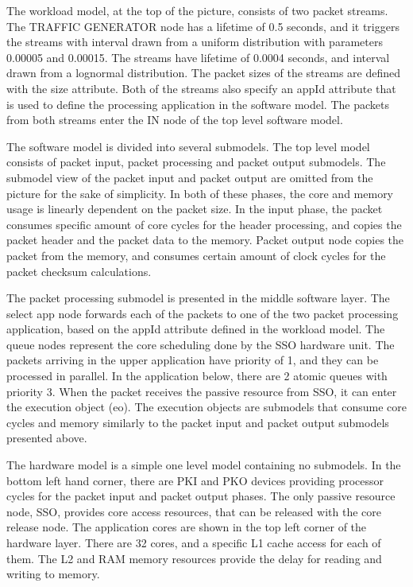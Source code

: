The workload model, at the top of the picture, consists of two packet streams. The TRAFFIC GENERATOR node has a lifetime of 0.5 seconds, and it triggers the streams with interval drawn from a uniform distribution with parameters 0.00005 and 0.00015. The streams have lifetime of 0.0004 seconds, and interval drawn from a lognormal distribution. The packet sizes of the streams are defined with the size attribute. Both of the streams also specify an appId attribute that is used to define the processing application in the software model. The packets from both streams enter the IN node of the top level software model.

The software model is divided into several submodels. The top level model consists of packet input, packet processing and packet output submodels. The submodel view of the packet input and packet output are omitted from the picture for the sake of simplicity. In both of these phases, the core and memory usage is linearly dependent on the packet size. In the input phase, the packet consumes specific amount of core cycles for the header processing, and copies the packet header and the packet data to the memory. Packet output node copies the packet from the memory, and consumes certain amount of clock cycles for the packet checksum calculations.

The packet processing submodel is presented in the middle software layer. The select app node forwards each of the packets to one of the two packet processing application, based on the appId attribute defined in the workload model. The queue nodes represent the core scheduling done by the SSO hardware unit. The packets arriving in the upper application have priority of 1, and they can be processed in parallel. In the application below, there are 2 atomic queues with priority 3. When the packet receives the passive resource from SSO, it can enter the execution object (eo). The execution objects are submodels that consume core cycles and memory similarly to the packet input and packet output submodels presented above.

The hardware model is a simple one level model containing no submodels. In the bottom left hand corner, there are PKI and PKO devices providing processor cycles for the packet input and packet output phases. The only passive resource node, SSO, provides core access resources, that can be released with the core release node. The application cores are shown in the top left corner of the hardware layer. There are 32 cores, and a specific L1 cache access for each of them. The L2 and RAM memory resources provide the delay for reading and writing to memory.

